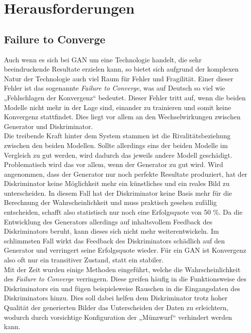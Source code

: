 \chapter{Herausforderungen}

\section{Failure to Converge}
\label{chap:FTC}

\noindent Auch wenn es sich bei \ac{GAN} um eine Technologie handelt, die sehr beeindruckende Resultate erzielen kann, so bietet sich aufgrund der komplexen Natur der Technologie auch viel Raum für Fehler und Fragilität. Einer dieser Fehler ist das sogenannte \textit{Failure to Converge}, was auf Deutsch so viel wie „Fehlschlagen der Konvergenz“ bedeutet. Dieser Fehler tritt auf, wenn die beiden Modelle nicht mehr in der Lage sind, einander zu trainieren und somit keine Konvergenz stattfindet. Dies liegt vor allem an den Wechselwirkungen zwischen Generator und Diskriminator. \\

\noindent Die treibende Kraft hinter dem System stammen ist die Rivalitätsbeziehung zwischen den beiden Modellen. Sollte allerdings eins der beiden Modelle im Vergleich zu gut werden, wird dadurch das jeweils andere Modell geschädigt. Problematisch wird das vor allem, wenn der Generator zu gut wird. Wird angenommen, dass der Generator nur noch perfekte Resultate produziert, hat der Diskriminator keine Möglichkeit mehr ein künstliches und ein reales Bild zu unterscheiden. In diesem Fall hat der Diskriminator keine Basis mehr für die Berechnung der Wahrscheinlichkeit und muss praktisch gesehen zufällig entscheiden, schafft also statistisch nur noch eine Erfolgsquote von 50 \%. Da die Entwicklung des Generators allerdings auf inhaltsvollem Feedback des Diskriminators beruht, kann dieses sich nicht mehr weiterentwickeln. Im schlimmsten Fall wirkt das Feedback des Diskriminators schädlich auf den Generator und verringert seine Erfolgsquote wieder. Für ein \ac{GAN} ist Konvergenz also oft nur ein transitiver Zustand, statt ein stabiler.\\

\noindent Mit der Zeit wurden einige Methoden eingeführt, welche die Wahrscheinlichkeit des \textit{Failure to Converge} verringern. Diese greifen häufig in die Funktionsweise des Diskriminators ein und fügen beispielsweise Rauschen in die Eingangsdaten des Diskriminators hinzu. Dies soll dabei helfen dem Diskriminator trotz hoher Qualität der generierten Bilder das Unterscheiden der Daten zu erleichtern, wodurch durch vorsichtige Konfiguration der „Münzwurf“ verhindert werden kann.\cite{training} \\